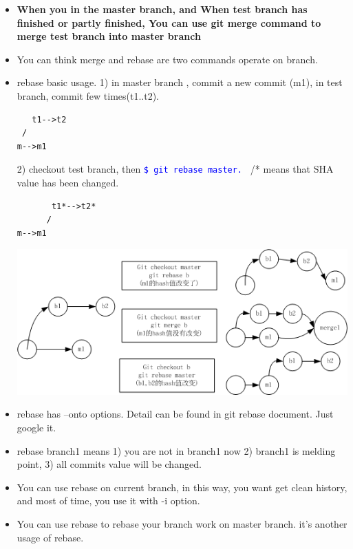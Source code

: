 \documentclass[a4paper,12pt,twoside]{book}
\newcommand{\linuxcommand}[1]{\texttt{\textcolor{blue}{\$ #1 \Pisymbol{psy}{191}}}}
\begin{document}
\begin{itemize}
\item \textbf{When you in the master branch, and When test branch has finished or partly finished, You can use git merge command to merge test branch into master branch}

\item You can think merge and rebase are two commands operate on branch.

\item rebase basic usage.
1) in master  branch , commit a new commit (m1), in test branch, commit few times(t1..t2). \\
\begin{verbatim}
   t1-->t2
 /
m-->m1
\end{verbatim}
2) checkout test branch, then \linuxcommand{git rebase master.} /* means that SHA value has been changed.\\
\begin{verbatim}
       t1*-->t2*
      /
m-->m1
\end{verbatim}

\includegraphics[scale=0.7]{pics/Git_rebase} \\

\item rebase has --onto options. Detail can be found in git rebase document. Just google it. 

\item rebase branch1 means 1) you are not in branch1 now 2) branch1 is melding point, 3) all commits value will be changed. 

\item You can use rebase on current branch, in this way, you want get clean history, and most of time, you use it with -i option. 
\item You can use rebase to rebase your branch work on master branch. it's another usage of rebase. 

\end{itemize}
\end{document}
